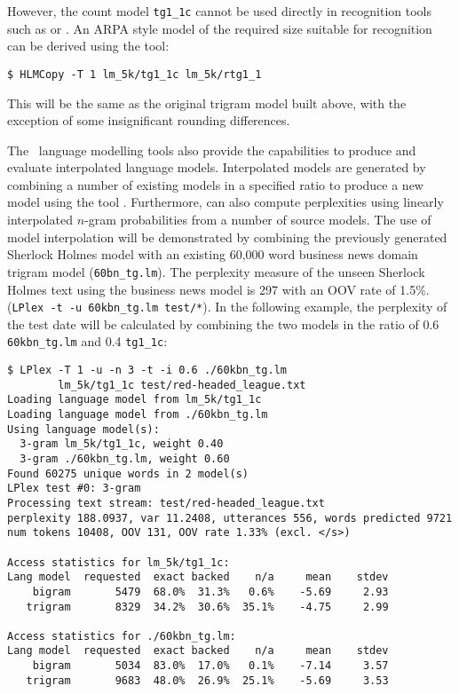However, the count model \texttt{tg1\_1c} cannot be used directly in
recognition tools such as  or .  An ARPA
style model of the required size suitable for recognition can be
derived using the  tool:
\begin{verbatim}
$ HLMCopy -T 1 lm_5k/tg1_1c lm_5k/rtg1_1
\end{verbatim} %
This will be the same as the original trigram model built above, with
the exception of some insignificant rounding differences.


The \HTK\ language modelling tools also provide the capabilities to
produce and evaluate interpolated language models.  Interpolated
models are generated by combining a number of existing models in a
specified ratio to produce a new model using the tool .
Furthermore,  can also compute perplexities using
linearly interpolated $n$-gram probabilities from a number of source
models.  The use of model interpolation will be demonstrated by
combining the previously generated Sherlock Holmes model with an
existing 60,000 word business news domain trigram model
(\texttt{60bn\_tg.lm}).  The perplexity measure of the unseen Sherlock
Holmes text using the business news model is 297 with an OOV rate of
1.5\%.  ({\tt LPlex -t -u 60kbn\_tg.lm test/*}). In the following
example, the perplexity of the test date will be calculated by
combining the two models in the ratio of 0.6 \texttt{60kbn\_tg.lm} and
0.4 \texttt{tg1\_1c}:
\begin{verbatim}
$ LPlex -T 1 -u -n 3 -t -i 0.6 ./60kbn_tg.lm 
        lm_5k/tg1_1c test/red-headed_league.txt
Loading language model from lm_5k/tg1_1c
Loading language model from ./60kbn_tg.lm
Using language model(s): 
  3-gram lm_5k/tg1_1c, weight 0.40
  3-gram ./60kbn_tg.lm, weight 0.60
Found 60275 unique words in 2 model(s)
LPlex test #0: 3-gram
Processing text stream: test/red-headed_league.txt
perplexity 188.0937, var 11.2408, utterances 556, words predicted 9721
num tokens 10408, OOV 131, OOV rate 1.33% (excl. </s>)

Access statistics for lm_5k/tg1_1c:
Lang model  requested  exact backed    n/a     mean    stdev
    bigram       5479  68.0%  31.3%   0.6%    -5.69     2.93
   trigram       8329  34.2%  30.6%  35.1%    -4.75     2.99

Access statistics for ./60kbn_tg.lm:
Lang model  requested  exact backed    n/a     mean    stdev
    bigram       5034  83.0%  17.0%   0.1%    -7.14     3.57
   trigram       9683  48.0%  26.9%  25.1%    -5.69     3.53
\end{verbatim} %

